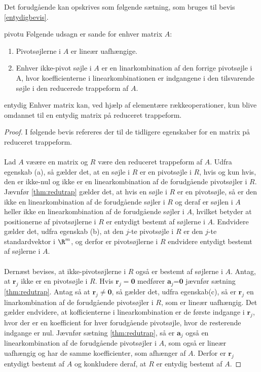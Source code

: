 Det forudgående kan opskrives som følgende sætning, som bruges til bevis \ref{entydigbevis}.

\begin{thm}{}{pivotu}
Følgende udsagn er sande for enhver matrix $A$: 
\begin{enumerate}[label=(\alph*)]
\item Pivotsøjlerne i $A$ er lineær uafhængige. 
\item Enhver ikke-pivot søjle i $A$ er en linarkombination af den forrige pivotsøjle i A, hvor koefficienterne i linearkombinationen er indgangene i den tilsvarende søjle i den reducerede trappeform af $A$. 
\end{enumerate} 
\end{thm}

\begin{thm}{}{entydig}
Enhver matrix kan, ved hjælp af elementære rækkeoperationer, kun blive omdannet til en entydig matrix på reduceret trappeform.
\end{thm}
%
\begin{proof}\label{entydigbevis}
I følgende bevis refereres der til de tidligere egenskaber for en matrix på reduceret trappeform. \\\\
Lad $A$ væære en matrix og $R$ være den reduceret trappeform af $A$. Udfra egenskab (a), så gælder det, at en søjle i $R$ er en pivotsøjle i $R$, hvis og kun hvis, den er ikke-nul og ikke er en linearkombination af de forudgående pivotsøjler i $R$. Jævnfør \ref{thm:redutrap} gælder det, at hvis en søjle i $R$ er en pivotsøjle, så er den ikke en linearkombination af de forudgående søjler i $R$ og deraf er søjlen i $A$ heller ikke en linearkombination af de forudgående  søjler i $A$, hvilket betyder at positionerne af pivotsøjlerne i $R$ er entydigt bestemt af søjlerne i $A$. Endvidere gælder det, udfra egenskab (b), at den $j$-te pivotsøjle i $R$ er den $j$-te standardvektor i $\R^m$, og derfor er pivotsøjlerne i $R$ endvidere entydigt bestemt af søjlerne i $A$. \\\\
Dernæst bevises, at ikke-pivotsøjlerne i $R$ også er bestemt af søjlerne i $A$. Antag, at $\textbf{r}_j$ ikke er en pivotsøjle i $R$. Hvis $\textbf{r}_j=\textbf{0}$ medfører $\textbf{a}_j$=$\textbf{0}$ jævnfør sætning \ref{thm:redutrap}. Antag så at $\textbf{r}_j \neq \textbf{0}$, så gælder det, udfra egenskab(c), så er $\textbf{r}_j$ en linarkombination af de forudgående pivotsøjler i $R$, som er lineær uafhængig. Det gælder endvidere, at kofficienterne i linearkombination er de første indgange i $\textbf{r}_j$, hvor der er en koefficient for hver forudgående pivotsøjle, hvor de resterende indgange er nul. Jævnfør sætning \ref{thm:redutrap}, så er $\textbf{a}_j$ også en linearkombination af de forudgående pivotsøjler i $A$, som også er lineær uafhængig og har de samme koefficienter, som afhænger af $A$. Derfor er $\textbf{r}_j$ entydigt bestemt af $A$ og konkludere deraf, at $R$ er entydig bestemt af $A$. 
\end{proof}
